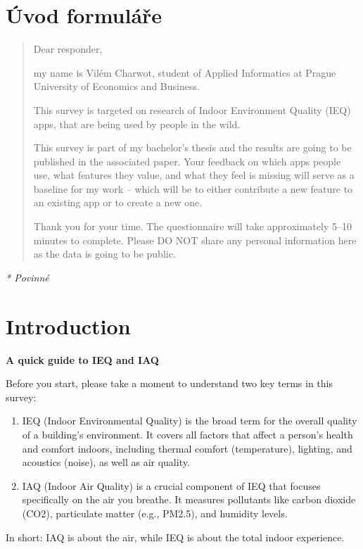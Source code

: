 \section*{Úvod formuláře}

\begin{quote}
Dear responder,

my name is Vilém Charwot, student of Applied Informatics at Prague University of Economics and Business.

This survey is targeted on research of Indoor Environment Quality (IEQ) apps, that are being used by people in the wild.

This survey is part of my bachelor's thesis and the results are going to be published in the associated paper. Your feedback on which apps people use, what features they value, and what they feel is missing will serve as a baseline for my work -- which will be to either contribute a new feature to an existing app or to create a new one.

Thank you for your time. The questionnaire will take approximately 5--10 minutes to complete. Please DO NOT share any personal information here as the data is going to be public.
\end{quote}

\textit{* Povinné}

\section*{Introduction}
\textbf{A quick guide to IEQ and IAQ}

Before you start, please take a moment to understand two key terms in this survey:

\begin{enumerate}[leftmargin=1.6em]
\item IEQ (Indoor Environmental Quality) is the broad term for the overall quality of a building's environment. It covers all factors that affect a person's health and comfort indoors, including thermal comfort (temperature), lighting, and acoustics (noise), as well as air quality.
\item IAQ (Indoor Air Quality) is a crucial component of IEQ that focuses specifically on the air you breathe. It measures pollutants like carbon dioxide (CO2), particulate matter (e.g., PM2.5), and humidity levels.
\end{enumerate}

In short: IAQ is about the air, while IEQ is about the total indoor experience.

